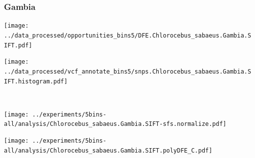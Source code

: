 \subsubsection{Gambia}

\begin{minipage}{0.49\linewidth}
    \texttt{[image: ../data\_processed/opportunities\_bins5/DFE.Chlorocebus\_sabaeus.Gambia.SIFT.pdf]}
\end{minipage}
\begin{minipage}{0.49\linewidth}
    \texttt{[image: ../data\_processed/vcf\_annotate\_bins5/snps.Chlorocebus\_sabaeus.Gambia.SIFT.histogram.pdf]}
\end{minipage}
\\
\begin{minipage}{0.49\linewidth}
    \texttt{[image: ../experiments/5bins-all/analysis/Chlorocebus\_sabaeus.Gambia.SIFT-sfs.normalize.pdf]}
\end{minipage}
\begin{minipage}{0.4\linewidth}
    \texttt{[image: ../experiments/5bins-all/analysis/Chlorocebus\_sabaeus.Gambia.SIFT.polyDFE\_C.pdf]}
\end{minipage}
